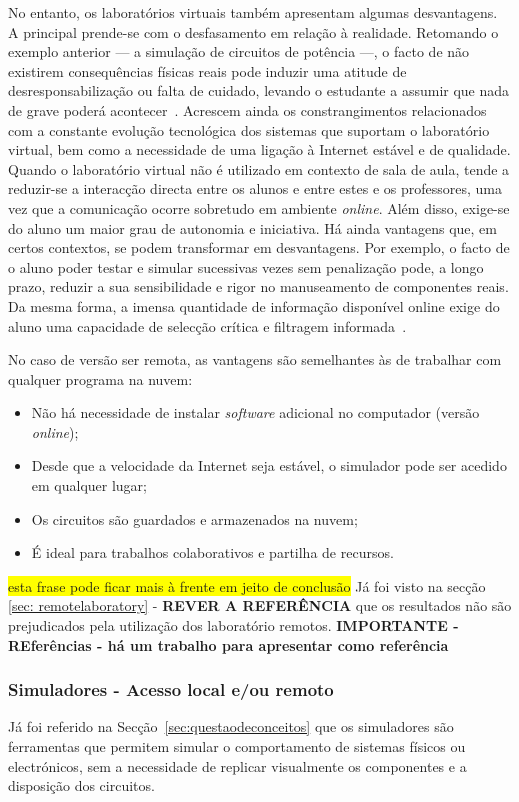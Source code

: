 No entanto, os laboratórios virtuais também apresentam algumas desvantagens. A principal prende-se com o desfasamento em relação à realidade. Retomando o exemplo anterior — a simulação de circuitos de potência —, o facto de não existirem consequências físicas reais pode induzir uma atitude de desresponsabilização ou falta de cuidado, levando o estudante a assumir que nada de grave poderá acontecer~\cite{POTKONJAK2016309}. Acrescem ainda os constrangimentos relacionados com a constante evolução tecnológica dos sistemas que suportam o laboratório virtual, bem como a necessidade de uma ligação à Internet estável e de qualidade. Quando o laboratório virtual não é utilizado em contexto de sala de aula, tende a reduzir-se a interacção directa entre os alunos e entre estes e os professores, uma vez que a comunicação ocorre sobretudo em ambiente \textit{online}. Além disso, exige-se do aluno um maior grau de autonomia e iniciativa. Há ainda vantagens que, em certos contextos, se podem transformar em desvantagens. Por exemplo, o facto de o aluno poder testar e simular sucessivas vezes sem penalização pode, a longo prazo, reduzir a sua sensibilidade e rigor no manuseamento de componentes reais. Da mesma forma, a imensa quantidade de informação disponível online exige do aluno uma capacidade de selecção crítica e filtragem informada~\cite{POTKONJAK2016309, vabtegensVL, Gherasim, Ghergulescu2019Feb}.

No caso de versão ser remota, as vantagens são semelhantes às de trabalhar com qualquer programa na nuvem:
\begin{itemize}
    \item Não há necessidade de instalar \textit{software} adicional no computador (versão \textit{online});
    \item Desde que a velocidade da Internet seja estável, o simulador pode ser acedido em qualquer lugar;
    \item Os circuitos são guardados e armazenados na nuvem;
    \item É ideal para trabalhos colaborativos e partilha de recursos.
\end{itemize}

\colorbox{yellow}{esta frase pode ficar mais à frente em jeito de conclusão}
Já foi visto na secção \ref{sec: remotelaboratory} - \textbf{REVER A REFERÊNCIA} que os resultados não são prejudicados pela utilização dos \acrshort{laboratório remoto}s. \textbf{IMPORTANTE - REferências - há um trabalho para apresentar como referência}

\subsubsection{Simuladores - Acesso local e/ou remoto}
Já foi referido na Secção~\ref{sec:questaodeconceitos} que os simuladores são ferramentas que permitem simular o comportamento de sistemas físicos ou electrónicos, sem a necessidade de replicar visualmente os componentes e a disposição dos circuitos. 

